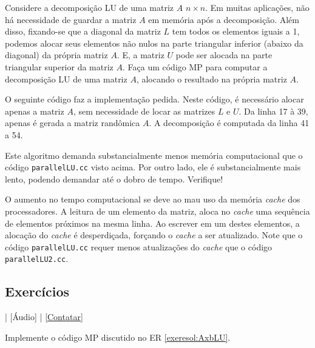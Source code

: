 \begin{exeresol}\label{exeresol:parallelLU2}
  Considere a decomposição LU de uma matriz $A$ $n\times n$. Em muitas aplicações, não há necessidade de guardar a matriz $A$ em memória após a decomposição. Além disso, fixando-se que a diagonal da matriz $L$ tem todos os elementos iguais a 1, podemos alocar seus elementos não nulos na parte triangular inferior (abaixo da diagonal) da própria matriz $A$. E, a matriz $U$ pode ser alocada na parte triangular superior da matriz $A$. Faça um código MP para computar a decomposição LU de uma matriz $A$, alocando o resultado na própria matriz $A$.
\end{exeresol}
\begin{resol}
  O seguinte código faz a implementação pedida. Neste código, é necessário alocar apenas a matriz $A$, sem necessidade de locar as matrizes $L$ e $U$. Da linha 17 à 39, apenas é gerada a matriz randômica $A$. A decomposição é computada da linha 41 a 54.
  
  

  Este algoritmo demanda substancialmente menos memória computacional que o código \verb+parallelLU.cc+ visto acima. Por outro lado, ele é substancialmente mais lento, podendo demandar até o dobro de tempo. Verifique!

  O aumento no tempo computacional se deve ao mau uso da memória {\it cache} dos processadores. A leitura de um elemento da matriz, aloca no {\it cache} uma sequência de elementos próximos na mesma linha. Ao escrever em um destes elementos, a alocação do {\it cache} é desperdiçada, forçando o {\it cache} a ser atualizado. Note que o código \verb+parallelLU.cc+ requer menos atualizações do {\it cache} que o código \verb+parallelLU2.cc+.
\end{resol}

\subsection*{Exercícios}

\begin{flushright}
  [Vídeo] | [Áudio] | \href{https://phkonzen.github.io/notas/contato.html}{[Contatar]}
\end{flushright}

\begin{exer}\label{exer:AxbLU}
  Implemente o código MP discutido no ER \ref{exeresol:AxbLU}.
\end{exer}

